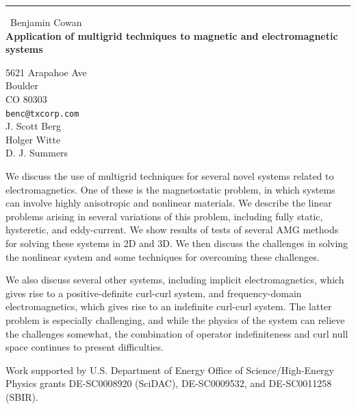 \documentclass{report}
\begin{document}
\begin{center}
\rule{6in}{1pt} \
{\large Benjamin Cowan \\
{\bf Application of multigrid techniques to magnetic and electromagnetic systems}}

5621 Arapahoe Ave \\ Boulder \\ CO 80303
\\
{\tt benc@txcorp.com}\\
J. Scott Berg\\
Holger Witte\\
D. J. Summers\end{center}

We discuss the use of multigrid techniques for several novel systems
related to electromagnetics. One of these is the magnetostatic problem,
in which systems can involve highly anisotropic and nonlinear materials.
We describe the linear problems arising in several variations of this
problem, including fully static, hysteretic, and eddy-current. We show
results of tests of several AMG methods for solving these systems in 2D
and 3D. We then discuss the challenges in solving the nonlinear system
and some techniques for overcoming these challenges.

We also discuss several other systems, including implicit
electromagnetics, which gives rise to a positive-definite curl-curl
system, and frequency-domain electromagnetics, which gives rise to an
indefinite curl-curl system. The latter problem is especially
challenging, and while the physics of the system can relieve the
challenges somewhat, the combination of operator indefiniteness and curl
null space continues to present difficulties.

Work supported by U.S. Department of Energy Office of Science/High-Energy
Physics grants DE-SC0008920 (SciDAC), DE-SC0009532, and DE-SC0011258
(SBIR).
\end{document}
